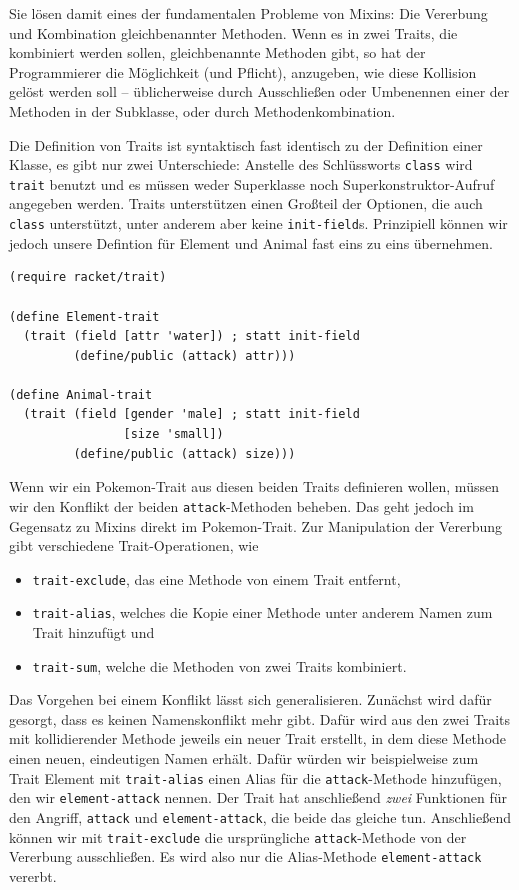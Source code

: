 Sie lösen damit eines der fundamentalen Probleme von Mixins: Die Vererbung und Kombination gleichbenannter Methoden. Wenn es in zwei Traits, die kombiniert werden sollen, gleichbenannte Methoden gibt, so hat der Programmierer die Möglichkeit (und Pflicht), anzugeben, wie diese Kollision gelöst werden soll -- üblicherweise durch Ausschließen oder Umbenennen einer der Methoden in der Subklasse, oder durch Methodenkombination.

Die Definition von Traits ist syntaktisch fast identisch zu der Definition einer Klasse, es gibt nur zwei Unterschiede: Anstelle des Schlüssworts \texttt{class} wird \texttt{trait} benutzt und es müssen weder Superklasse noch Superkonstruktor-Aufruf angegeben werden. Traits unterstützen einen Großteil der Optionen, die auch \texttt{class} unterstützt, unter anderem aber keine \texttt{init-field}s. Prinzipiell können wir jedoch unsere Defintion für Element und Animal fast eins zu eins übernehmen. 

\begin{lstlisting}
(require racket/trait)

(define Element-trait
  (trait (field [attr 'water]) ; statt init-field
         (define/public (attack) attr)))

(define Animal-trait
  (trait (field [gender 'male] ; statt init-field
                [size 'small])
         (define/public (attack) size)))
\end{lstlisting}

Wenn wir ein Pokemon-Trait aus diesen beiden Traits definieren wollen, müssen wir den Konflikt der beiden \texttt{attack}-Methoden beheben. Das geht jedoch im Gegensatz zu Mixins direkt im Pokemon-Trait. Zur Manipulation der Vererbung gibt verschiedene Trait-Operationen, wie
\begin{itemize}
 \item \texttt{trait-exclude}, das eine Methode von einem Trait entfernt,
 \item \texttt{trait-alias}, welches die Kopie einer Methode unter anderem Namen zum Trait hinzufügt und
 \item \texttt{trait-sum}, welche die Methoden von zwei Traits kombiniert.
\end{itemize}

Das Vorgehen bei einem Konflikt lässt sich generalisieren. Zunächst wird dafür gesorgt, dass es keinen Namenskonflikt mehr gibt. Dafür wird aus den zwei Traits mit kollidierender Methode jeweils ein neuer Trait erstellt, in dem diese Methode einen neuen, eindeutigen Namen erhält. Dafür würden wir beispielweise zum Trait Element mit \texttt{trait-alias} einen Alias für die \texttt{attack}-Methode hinzufügen, den wir \texttt{element-attack} nennen. Der Trait hat anschließend \emph{zwei} Funktionen für den Angriff, \texttt{attack} und \texttt{element-attack}, die beide das gleiche tun. Anschließend können wir mit \texttt{trait-exclude} die ursprüngliche \texttt{attack}-Methode von der Vererbung ausschließen. Es wird also nur die Alias-Methode \texttt{element-attack} vererbt.

